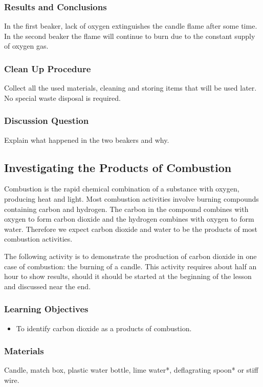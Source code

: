 \subsubsection*{Results and Conclusions}
In the first beaker, lack of oxygen extinguishes the candle flame after some time. In the second beaker the flame will continue to burn due to the constant supply of oxygen gas. 

\subsubsection*{Clean Up Procedure}
Collect all the used materials, cleaning and storing items that will be used later. No special waste disposal is required.

\subsubsection*{Discussion Question}
Explain what happened in the two beakers and why.


\subsection{Investigating the Products of Combustion}

Combustion is the rapid chemical combination of a substance with oxygen, producing heat and light. Most combustion activities involve burning compounds containing carbon and hydrogen. The carbon in the compound combines with oxygen to form carbon dioxide and the hydrogen combines with oxygen to form water. Therefore we expect carbon dioxide and water to be the products of most combustion activities.

The following activity is to demonstrate the production of carbon dioxide in one case of combustion: the burning of a candle. This activity requires about half an hour to show results, should it should be started at the beginning of the lesson and discussed near the end.

\subsubsection*{Learning Objectives}
\begin{itemize}
\item{To identify carbon dioxide as a products of combustion.}
\end{itemize}

\subsubsection*{Materials}
Candle, match box, plastic water bottle, lime water*, deflagrating spoon* or stiff wire.

